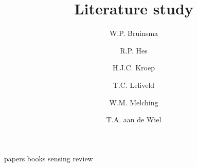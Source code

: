 \documentclass[a4paper, openany, oneside]{memoir}
\title{Literature study}
\author{W.P. Bruinsma \and R.P. Hes \and H.J.C. Kroep \and T.C. Leliveld \and W.M. Melching \and T.A. aan de Wiel}
\begin{document}
\frontmatter

\begin{titlingpage}
  \pagestyle{empty}
  \maketitle
\end{titlingpage}

\clearpage

\tableofcontents

\mainmatter
{papers}
{books}
{sensing}
{review}


\printbibliography

\appendix
\end{document}
